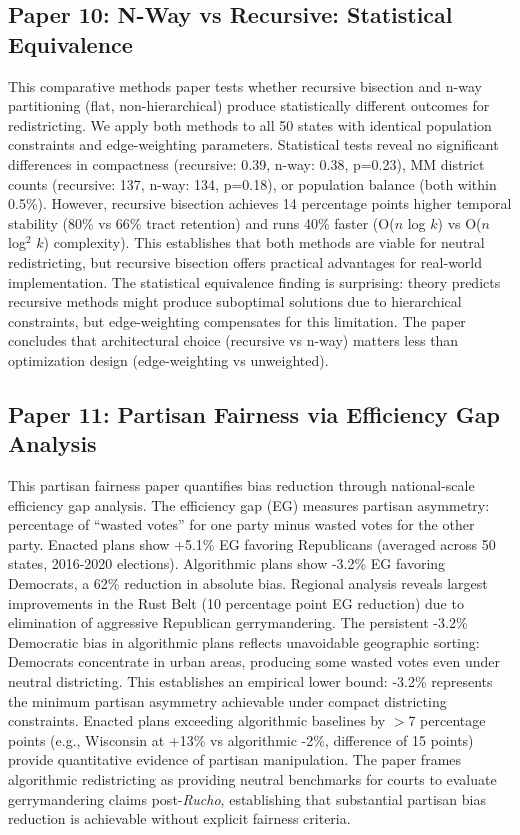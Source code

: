 \documentclass[11pt]{article}
\begin{document}
\subsection*{Paper 10: N-Way vs Recursive: Statistical Equivalence}

This comparative methods paper tests whether recursive bisection and n-way partitioning (flat, non-hierarchical) produce statistically different outcomes for redistricting. We apply both methods to all 50 states with identical population constraints and edge-weighting parameters. Statistical tests reveal no significant differences in compactness (recursive: 0.39, n-way: 0.38, p=0.23), MM district counts (recursive: 137, n-way: 134, p=0.18), or population balance (both within 0.5\%). However, recursive bisection achieves 14 percentage points higher temporal stability (80\% vs 66\% tract retention) and runs 40\% faster (O($n$ log $k$) vs O($n$ log$^2$ $k$) complexity). This establishes that both methods are viable for neutral redistricting, but recursive bisection offers practical advantages for real-world implementation. The statistical equivalence finding is surprising: theory predicts recursive methods might produce suboptimal solutions due to hierarchical constraints, but edge-weighting compensates for this limitation. The paper concludes that architectural choice (recursive vs n-way) matters less than optimization design (edge-weighting vs unweighted).

\subsection*{Paper 11: Partisan Fairness via Efficiency Gap Analysis}

This partisan fairness paper quantifies bias reduction through national-scale efficiency gap analysis. The efficiency gap (EG) measures partisan asymmetry: percentage of ``wasted votes'' for one party minus wasted votes for the other party. Enacted plans show +5.1\% EG favoring Republicans (averaged across 50 states, 2016-2020 elections). Algorithmic plans show -3.2\% EG favoring Democrats, a 62\% reduction in absolute bias. Regional analysis reveals largest improvements in the Rust Belt (10 percentage point EG reduction) due to elimination of aggressive Republican gerrymandering. The persistent -3.2\% Democratic bias in algorithmic plans reflects unavoidable geographic sorting: Democrats concentrate in urban areas, producing some wasted votes even under neutral districting. This establishes an empirical lower bound: -3.2\% represents the minimum partisan asymmetry achievable under compact districting constraints. Enacted plans exceeding algorithmic baselines by $>$7 percentage points (e.g., Wisconsin at +13\% vs algorithmic -2\%, difference of 15 points) provide quantitative evidence of partisan manipulation. The paper frames algorithmic redistricting as providing neutral benchmarks for courts to evaluate gerrymandering claims post-\emph{Rucho}, establishing that substantial partisan bias reduction is achievable without explicit fairness criteria.
\end{document}
